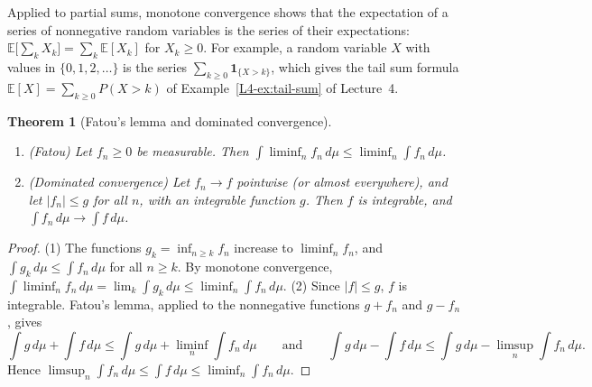 \documentclass[11pt]{article}
\newcommand{\E}{\mathbb{E}}
\theoremstyle{definition}
\theoremstyle{plain}
\newtheorem{theorem}[definition]{Theorem}
\theoremstyle{remark}
\begin{document}
Applied to partial sums, monotone convergence shows that the expectation of a series of nonnegative random variables is the series of their expectations: $\E\big[\sum_k X_k\big] = \sum_k \E[X_k]$ for $X_k \geq 0$. For example, a random variable $X$ with values in $\{0, 1, 2, \ldots\}$ is the series $\sum_{k \geq 0} \mathbf{1}_{\{X > k\}}$, which gives the tail sum formula $\E[X] = \sum_{k \geq 0} P(X > k)$ of Example~\ref{L4-ex:tail-sum} of Lecture~4.

\begin{theorem}[Fatou's lemma and dominated convergence]\label{thm:dominated}
    \begin{enumerate}
        \item (Fatou) Let $f_n \geq 0$ be measurable. Then $\int \liminf_n f_n\, d\mu \leq \liminf_n \int f_n\, d\mu$.
        \item (Dominated convergence) Let $f_n \to f$ pointwise (or almost everywhere), and let $|f_n| \leq g$ for all $n$, with an integrable function $g$. Then $f$ is integrable, and $\int f_n\, d\mu \to \int f\, d\mu$.
    \end{enumerate}
\end{theorem}

\begin{proof}
    (1) The functions $g_k = \inf_{n \geq k} f_n$ increase to $\liminf_n f_n$, and $\int g_k\, d\mu \leq \int f_n\, d\mu$ for all $n \geq k$. By monotone convergence, $\int \liminf_n f_n\, d\mu = \lim_k \int g_k\, d\mu \leq \liminf_n \int f_n\, d\mu$. (2) Since $|f| \leq g$, $f$ is integrable. Fatou's lemma, applied to the nonnegative functions $g + f_n$ and $g - f_n$, gives
    \[\int g\, d\mu + \int f\, d\mu \leq \int g\, d\mu + \liminf_n \int f_n\, d\mu \qquad \text{and} \qquad \int g\, d\mu - \int f\, d\mu \leq \int g\, d\mu - \limsup_n \int f_n\, d\mu.\]
    Hence $\limsup_n \int f_n\, d\mu \leq \int f\, d\mu \leq \liminf_n \int f_n\, d\mu$.
\end{proof}
\end{document}
